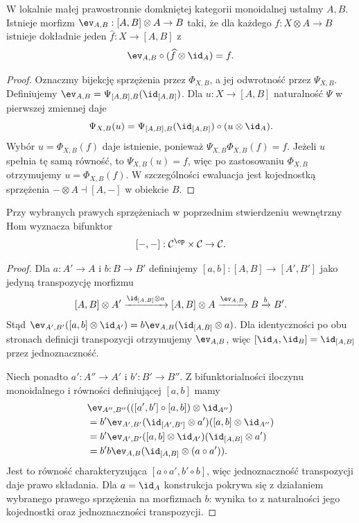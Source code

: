 \begin{stwierdzenie}\label{cat:prop:internal-hom-eval}
W lokalnie małej prawostronnie domkniętej kategorii monoidalnej ustalmy $A,B$. Istnieje morfizm $\ev_{A,B}:[A,B]\otimes A\to B$ taki, że dla każdego $f:X\otimes A\to B$ istnieje dokładnie jeden $\widehat f:X\to[A,B]$ z
\[
\ev_{A,B}\circ(\widehat f\otimes\id_A)=f.
\]
\end{stwierdzenie}
\begin{proof}
Oznaczmy bijekcję sprzężenia przez $\Phi_{X,B}$, a jej odwrotność przez $\Psi_{X,B}$. Definiujemy $\ev_{A,B}=\Psi_{[A,B],B}(\id_{[A,B]})$. Dla $u:X\to[A,B]$ naturalność $\Psi$ w pierwszej zmiennej daje
\[
\Psi_{X,B}(u)=
\Psi_{[A,B],B}(\id_{[A,B]})\circ(u\otimes\id_A).
\]
Wybór $u=\Phi_{X,B}(f)$ daje istnienie, ponieważ $\Psi_{X,B}\Phi_{X,B}(f)=f$. Jeżeli $u$ spełnia tę samą równość, to $\Psi_{X,B}(u)=f$, więc po zastosowaniu $\Phi_{X,B}$ otrzymujemy $u=\Phi_{X,B}(f)$. W szczególności ewaluacja jest kojednostką sprzężenia $-\otimes A\dashv[A,-]$ w obiekcie $B$.
\end{proof}

\begin{stwierdzenie}\label{cat:prop:internal-hom-bifunctor}
Przy wybranych prawych sprzężeniach w poprzednim stwierdzeniu wewnętrzny Hom wyznacza bifunktor
\[
[-,-]:\mathcal C^{\op}\times\mathcal C\to\mathcal C.
\]
\end{stwierdzenie}
\begin{proof}
Dla $a:A'\to A$ i $b:B\to B'$ definiujemy $[a,b]:[A,B]\to[A',B']$ jako jedyną transpozycję morfizmu
\[
[A,B]\otimes A'\xrightarrow{\id_{[A,B]}\otimes a}
[A,B]\otimes A\xrightarrow{\ev_{A,B}}B\xrightarrow{b}B'.
\]
Stąd $\ev_{A',B'}([a,b]\otimes\id_{A'})=b\ev_{A,B}(\id_{[A,B]}\otimes a)$. Dla identyczności po obu stronach definicji transpozycji otrzymujemy $\ev_{A,B}$, więc $[\id_A,\id_B]=\id_{[A,B]}$ przez jednoznaczność.

Niech ponadto $a':A''\to A'$ i $b':B'\to B''$. Z bifunktorialności iloczynu monoidalnego i równości definiującej $[a,b]$ mamy
\[
\begin{aligned}
&\ev_{A'',B''}(([a',b']\circ[a,b])\otimes\id_{A''})\\
&=b'\ev_{A',B'}(\id_{[A',B']}\otimes a')([a,b]\otimes\id_{A''})\\
&=b'\ev_{A',B'}([a,b]\otimes\id_{A'})(\id_{[A,B]}\otimes a')\\
&=b'b\ev_{A,B}(\id_{[A,B]}\otimes(a\circ a')).
\end{aligned}
\]
Jest to równość charakteryzująca $[a\circ a',b'\circ b]$, więc jednoznaczność transpozycji daje prawo składania. Dla $a=\id_A$ konstrukcja pokrywa się z działaniem wybranego prawego sprzężenia na morfizmach $b$: wynika to z naturalności jego kojednostki oraz jednoznaczności transpozycji.
\end{proof}

